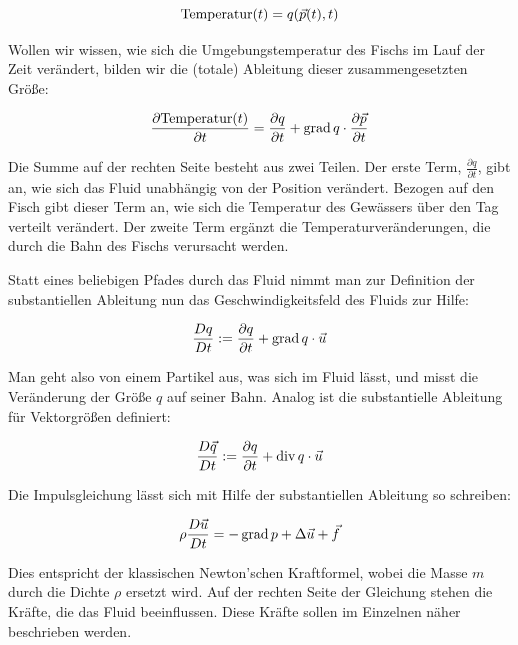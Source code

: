 \begin{equation}
\textrm{Temperatur}(t) = q(\vec{p}(t),t)
\end{equation}

Wollen wir wissen, wie sich die Umgebungstemperatur des Fischs im Lauf der Zeit
verändert, bilden wir die (totale) Ableitung dieser zusammengesetzten Größe:

\begin{equation}
\frac{
	\partial \textrm{Temperatur}(t)
}
{
	\partial t
}
=
\frac{
	\partial q
}
{
	\partial t
}
+
\operatorname*{grad} q \cdot
\frac{
	\partial \vec{p}}
{
	\partial t
}
\end{equation}

Die Summe auf der rechten Seite besteht aus zwei Teilen. Der erste Term,
$\frac{\partial q}{\partial t}$, gibt an, wie sich das Fluid unabhängig von
der Position verändert. Bezogen auf den Fisch gibt dieser Term an, wie
sich die Temperatur des Gewässers über den Tag verteilt verändert. Der
zweite Term ergänzt die Temperaturveränderungen, die durch die Bahn des
Fischs verursacht werden.

Statt eines beliebigen Pfades durch das Fluid nimmt man zur Definition der
substantiellen Ableitung nun das Geschwindigkeitsfeld des Fluids zur Hilfe:

\begin{equation}
\frac{
	Dq}
{
	Dt
} :=
\frac{
	\partial q
}
{
	\partial t
}
+
\operatorname*{grad} q \cdot
\vec{u}
\end{equation}

Man geht also von einem Partikel aus, was sich im Fluid 
lässt, und misst die Veränderung der Größe $q$ auf seiner Bahn. Analog ist die
substantielle Ableitung für Vektorgrößen definiert:

\begin{equation}
\frac{
	D\vec{q}}
{
	Dt
} :=
\frac{
	\partial q
}
{
	\partial t
}
+
\operatorname*{div} q \cdot
\vec{u}
\end{equation}

Die Impulsgleichung lässt sich mit Hilfe der substantiellen Ableitung so schreiben:

\begin{equation}
\rho \frac{D\vec{u}}{Dt} = - \operatorname*{grad} p + \Delta \vec{u} + \vec{f}
\end{equation}

Dies entspricht der klassischen Newton'schen Kraftformel, wobei die Masse $m$
durch die Dichte $\rho$ ersetzt wird. Auf der rechten Seite der Gleichung stehen die Kräfte, die das
Fluid beeinflussen. Diese Kräfte sollen im Einzelnen näher beschrieben
werden.


